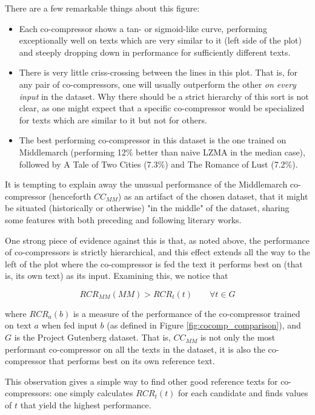 There are a few remarkable things about this figure:

\begin{itemize}
    \item Each co-compressor shows a tan- or sigmoid-like curve, performing exceptionally well on texts which are very similar to it (left side of the plot) and steeply dropping down in performance for sufficiently different texts.
    \item There is very little criss-crossing between the lines in this plot. That is, for any pair of co-compressors, one will usually outperform the other \emph{on every input} in the dataset. Why there should be a strict hierarchy of this sort is not clear, as one might expect that a specific co-compressor would be specialized for texts which are similar to it but not for others.
    \item The best performing co-compressor in this dataset is the one trained on Middlemarch (performing 12\% better than naive LZMA in the median case), followed by A Tale of Two Cities (7.3\%) and The Romance of Lust (7.2\%).
\end{itemize}

It is tempting to explain away the unusual performance of the Middlemarch co-compressor (henceforth $CC_{MM}$) as an artifact of the chosen dataset, that it might be situated (historically or otherwise) "in the middle" of the dataset, sharing some features with both preceding and following literary works.

One strong piece of evidence against this is that, as noted above, the performance of co-compressors is strictly hierarchical, and this effect extends all the way to the left of the plot where the co-compressor is fed the text it performs best on (that is, its own text) as its input. Examining this, we notice that

$$RCR_{MM}(MM) > RCR_t(t) \qquad \forall t \in G$$

where $RCR_a(b)$ is a measure of the performance of the co-compressor trained on text $a$ when fed input $b$ (as defined in Figure \ref{fig:cocomp_comparison}), and $G$ is the Project Gutenberg dataset. That is, $CC_{MM}$ is not only the most performant co-compressor on all the texts in the dataset, it is also the co-compressor that performs best on its own reference text.

This observation gives a simple way to find other good reference texts for co-compressors: one simply calculates $RCR_t(t)$ for each candidate and finds values of $t$ that yield the highest performance.

